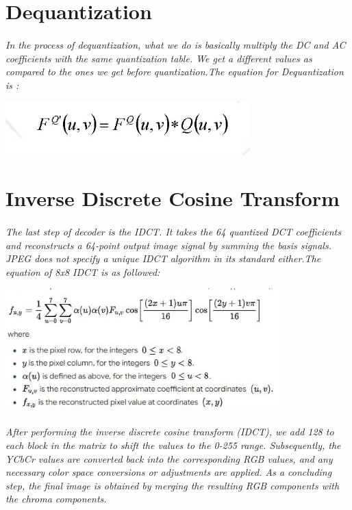 \documentclass[12pt, letterpaper]{article}
\begin{document}
\section{{\color{blue}Dequantization}}
\paragraph{}\textit{In the process of dequantization, what we do is basically multiply the DC  and AC coefficients with the same quantization table. We get a different  values as compared to the ones we get before quantization.The equation for Dequantization is :}
\begin{center}
    \includegraphics{Deq} 
\end{center}
\section{{\color{blue}Inverse Discrete Cosine Transform}}
\paragraph{}\textit{The last step of decoder is the IDCT. It takes the 64 quantized DCT coefficients and reconstructs a 64-point output image signal by summing the basis signals. JPEG does not specify a unique IDCT algorithm in its standard either.The equation of 8x8 IDCT is as followed:}
\begin{center}
    \includegraphics{IDCT.1} 
\end{center}
\paragraph{}\textit{After performing the inverse discrete cosine transform (IDCT), we add 128 to each block in the matrix to shift the values to the 0-255 range. Subsequently, the YCbCr values are converted back into the corresponding RGB values, and any necessary color space conversions or adjustments are applied. As a concluding step, the final image is obtained by merging the resulting RGB components with the chroma components.}
\end{document}
